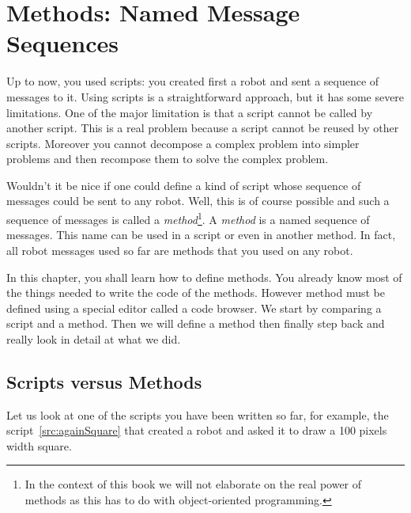 \ifx\wholebook\relax\else



\fi

\chapter{Methods: Named Message Sequences}\label{ch:turtleTeaching}\label{ch:abstraction}\label{cha:enseigner}




Up to now, you used scripts: you created first a robot and sent a sequence of 
messages to it. Using scripts is a straightforward approach, but it has some 
severe limitations. One of the major limitation is that a script cannot be called by another script. This is a real problem because a script cannot be reused by other scripts. Moreover you cannot decompose a complex problem into simpler problems and then recompose them to solve the complex problem.

Wouldn't it be nice if one could define a kind of script whose sequence of messages could be sent to any robot. Well, this is of course possible and such a sequence of messages is called a \emph{method}\footnote{In the context of this book we will not elaborate on the real power of methods as this has to do with 
object-oriented programming.}. A \emph{method} is a named sequence of messages. This name can be used in a script or even in another method.  In fact, all robot messages used so far are methods that you used on any robot. 

In this chapter, you shall learn how to define methods. You already know most of the things needed to write the code of the methods. However method must be defined using  a special editor called   a code browser. We start by comparing a script and a method. Then we will define a method then finally step back and really look in detail at what we did.


\section{Scripts versus Methods}
Let us look at one of the scripts you have been written so far, for
example, the script~\ref{src:againSquare} that created a
robot and asked it to draw a 100 pixels width square. 

